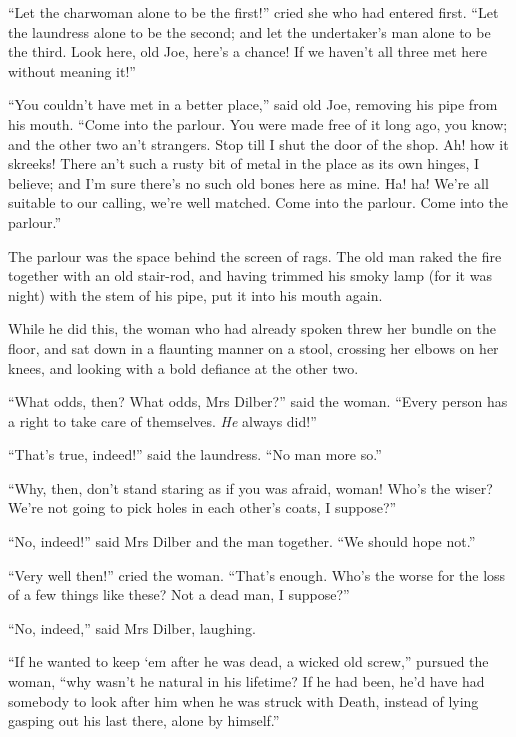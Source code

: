 \documentclass[paper=5.5in:8.5in,BCOR=5mm,twoside,DIV=calc,12pt,usegeometry]{scrbook} %
\begin{document}
\enquote{Let the charwoman alone to be the first!} cried she who had entered first. \enquote{Let the laundress alone to be the second; and let the undertaker's man alone to be the third. Look here, old Joe, here's a chance! If we haven't all three met here without meaning it!}

\enquote{You couldn't have met in a better place,} said old Joe, removing his pipe from his mouth. \enquote{Come into the parlour. You were made free of it long ago, you know; and the other two an't strangers. Stop till I shut the door of the shop. Ah! how it skreeks! There an't such a rusty bit of metal in the place as its own hinges, I believe; and I'm sure there's no such old bones here as mine. Ha! ha! We're all suitable to our calling, we're well matched. Come into the parlour. Come into the parlour.}

The parlour was the space behind the screen of rags. The old man raked the fire together with an old stair-rod, and having trimmed his smoky lamp (for it was night) with the stem of his pipe, put it into his mouth again.

While he did this, the woman who had already spoken threw her bundle on the floor, and sat down in a flaunting manner on a stool, crossing her elbows on her knees, and looking with a bold defiance at the other two.

\enquote{What odds, then? What odds, Mrs Dilber?} said the woman. \enquote{Every person has a right to take care of themselves. \textit{He} always did!}

\enquote{That's true, indeed!} said the laundress. \enquote{No man more so.}

\enquote{Why, then, don't stand staring as if you was afraid, woman! Who's the wiser? We're not going to pick holes in each other's coats, I suppose?}

\enquote{No, indeed!} said Mrs Dilber and the man together. \enquote{We should hope not.}

\enquote{Very well then!} cried the woman. \enquote{That's enough. Who's the worse for the loss of a few things like these? Not a dead man, I suppose?}

\enquote{No, indeed,} said Mrs Dilber, laughing.

\enquote{If he wanted to keep `em after he was dead, a wicked old screw,} pursued the woman, \enquote{why wasn't he natural in his lifetime? If he had been, he'd have had somebody to look after him when he was struck with Death, instead of lying gasping out his last there, alone by himself.}
\end{document}
